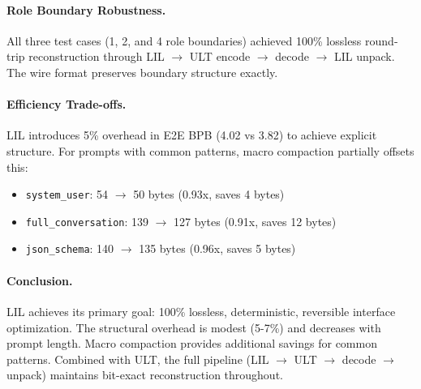 \paragraph{Role Boundary Robustness.}
All three test cases (1, 2, and 4 role boundaries) achieved 100\% lossless round-trip
reconstruction through LIL $\rightarrow$ ULT encode $\rightarrow$ decode $\rightarrow$ LIL unpack.
The wire format preserves boundary structure exactly.

\paragraph{Efficiency Trade-offs.}
LIL introduces 5\% overhead in E2E BPB (4.02 vs 3.82) to achieve explicit structure.
For prompts with common patterns, macro compaction partially offsets this:
\begin{itemize}
\item \texttt{system\_user}: 54 $\rightarrow$ 50 bytes (0.93x, saves 4 bytes)
\item \texttt{full\_conversation}: 139 $\rightarrow$ 127 bytes (0.91x, saves 12 bytes)
\item \texttt{json\_schema}: 140 $\rightarrow$ 135 bytes (0.96x, saves 5 bytes)
\end{itemize}

\paragraph{Conclusion.}
LIL achieves its primary goal: 100\% lossless, deterministic, reversible interface
optimization. The structural overhead is modest (5-7\%) and decreases with prompt
length. Macro compaction provides additional savings for common patterns.
Combined with ULT, the full pipeline (LIL $\rightarrow$ ULT $\rightarrow$ decode $\rightarrow$ unpack)
maintains bit-exact reconstruction throughout.
